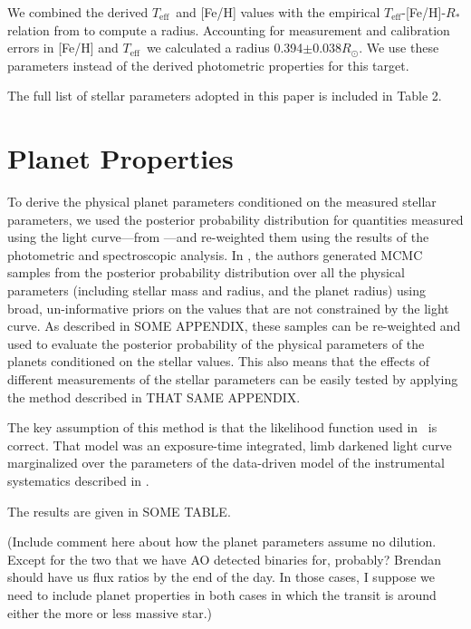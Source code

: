 \documentclass{emulateapj}
\newcommand\teff{\ensuremath{T_\text{eff}}}
\newcommand{\paperit}{\citet{Foreman-Mackey15}}
\begin{document}
We combined the derived \teff\ and [Fe/H] values with the empirical
\teff-[Fe/H]-$R_*$ relation from \citet{Mann15} to compute a radius.
Accounting for measurement and calibration errors in [Fe/H] and \teff\ we calculated
a radius 0.394$\pm0.038R_\odot$.
We use these parameters instead of the derived photometric properties for this target.

The full list of stellar parameters adopted in this paper is included in
Table 2.

\section{Planet Properties}

To derive the physical planet parameters conditioned on the measured stellar
parameters, we used the posterior probability distribution for quantities
measured using the light curve---from \paperit---and re-weighted them using
the results of the photometric and spectroscopic analysis.
In \paperit, the authors generated MCMC samples from the posterior
probability distribution over all the physical parameters (including stellar
mass and radius, and the planet radius) using broad, un-informative priors on
the values that are not constrained by the light curve.
As described in SOME APPENDIX, these samples can be re-weighted and used to
evaluate the posterior probability of the physical parameters of the planets
conditioned on the stellar values.
This also means that the effects of different measurements of the stellar
parameters can be easily tested by applying the method described in THAT SAME
APPENDIX.

The key assumption of this method is that the likelihood function used in
\paperit\ is correct.
That model was an exposure-time integrated, limb darkened light curve
\citep{Mandel02,Kipping10b} marginalized over the parameters of the
data-driven model of the instrumental systematics described in \paperit.

The results are given in SOME TABLE.


(Include comment here about how the planet parameters assume no dilution.
Except for the two that we have AO detected binaries for, probably?
Brendan should have us flux ratios by the end of the day.
In those cases, I suppose we need to include planet properties in both cases
in which the transit is around either the more or less massive star.)
\end{document}
